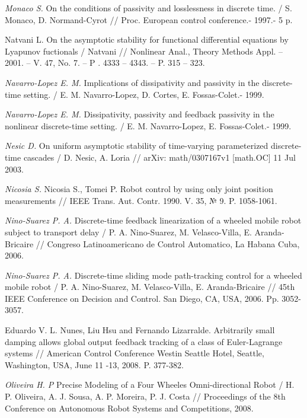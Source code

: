 \begin{thebibliography}{10}
	{\it Monaco S.} On the conditions of passivity and losslessness in discrete time. / S. Monaco, D. Normand-Cyrot // Proc. European control conference.- 1997.- 5 p.
	
	 Natvani L. On the asymptotic stability for functional differential equations by Lyapunov fuctionals  / Natvani // Nonlinear Anal., Theory Methods Appl. – 2001. – V. 47, No. 7. – P . 4333 – 4343. – P. 315 – 323.
	
	{\it Navarro-Lopez E. M.} Implications of dissipativity and passivity in the discrete-time setting. / E. M. Navarro-Lopez, D. Cortes, E. Fossas-Colet.- 1999.
	
	{\it Navarro-Lopez E. M.} Dissipativity, passivity and feedback passivity in the nonlinear discrete-time setting. / E. M. Navarro-Lopez, E. Fossas-Colet.- 1999.
	
	{\it Nesic D.} On uniform asymptotic stability of time-varying parameterized discrete-time cascades / D. Nesic, A. Loria // arXiv: math/0307167v1 [math.OC] 11 Jul 2003.
	
	{\it Nicosia S.} Nicosia S., Tomei P. Robot control by using only joint position measurements // IEEE Trans. Aut. Contr. 1990. V. 35, № 9. P. 1058-1061.
	
	
	{\it Nino-Suarez P. A.} Discrete-time feedback linearization of a wheeled mobile robot subject to transport delay / P. A.  Nino-Suarez, M. Velasco-Villa, E. Aranda-Bricaire // Congreso Latinoamericano de Control Automatico, La Habana Cuba, 2006.
	
	{\it Nino-Suarez P. A.} Discrete-time sliding mode path-tracking control for a wheeled mobile robot / P. A.  Nino-Suarez, M. Velasco-Villa, E. Aranda-Bricaire // 45th IEEE Conference on Decision and Control. San Diego, CA, USA, 2006. Pp. 3052-3057.
	
	Eduardo V. L. Nunes, Liu Hsu and Fernando Lizarralde. Arbitrarily small damping allows
	global output feedback tracking of a class of Euler-Lagrange systems // American Control Conference
	Westin Seattle Hotel, Seattle, Washington, USA, June 11 -13, 2008. P. 377-382.
	
	{\it Oliveira H. P} Precise Modeling of a Four Wheeles Omni-directional Robot / H. P. Oliveira, A. J. Sousa, A. P. Moreira, P. J. Costa // Proceedings of the 8th Conference on Autonomous Robot Systems and Competitions, 2008.
	

\end{thebibliography}
